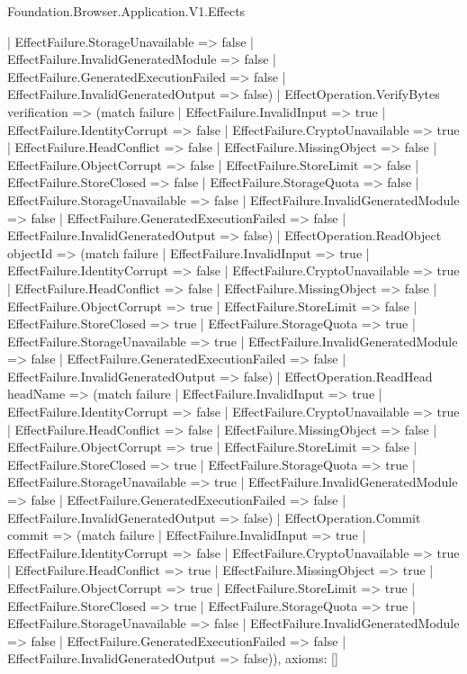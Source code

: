 \begin{lexlean}{Foundation.Browser.Application.V1.Effects}
\begin{semanticmodule}
{      | EffectFailure.StorageUnavailable => false
      | EffectFailure.InvalidGeneratedModule => false
      | EffectFailure.GeneratedExecutionFailed => false
      | EffectFailure.InvalidGeneratedOutput => false)
    | EffectOperation.VerifyBytes verification => (match failure
      | EffectFailure.InvalidInput => true
      | EffectFailure.IdentityCorrupt => false
      | EffectFailure.CryptoUnavailable => true
      | EffectFailure.HeadConflict => false
      | EffectFailure.MissingObject => false
      | EffectFailure.ObjectCorrupt => false
      | EffectFailure.StoreLimit => false
      | EffectFailure.StoreClosed => false
      | EffectFailure.StorageQuota => false
      | EffectFailure.StorageUnavailable => false
      | EffectFailure.InvalidGeneratedModule => false
      | EffectFailure.GeneratedExecutionFailed => false
      | EffectFailure.InvalidGeneratedOutput => false)
    | EffectOperation.ReadObject objectId => (match failure
      | EffectFailure.InvalidInput => true
      | EffectFailure.IdentityCorrupt => false
      | EffectFailure.CryptoUnavailable => true
      | EffectFailure.HeadConflict => false
      | EffectFailure.MissingObject => false
      | EffectFailure.ObjectCorrupt => true
      | EffectFailure.StoreLimit => false
      | EffectFailure.StoreClosed => true
      | EffectFailure.StorageQuota => true
      | EffectFailure.StorageUnavailable => true
      | EffectFailure.InvalidGeneratedModule => false
      | EffectFailure.GeneratedExecutionFailed => false
      | EffectFailure.InvalidGeneratedOutput => false)
    | EffectOperation.ReadHead headName => (match failure
      | EffectFailure.InvalidInput => true
      | EffectFailure.IdentityCorrupt => false
      | EffectFailure.CryptoUnavailable => true
      | EffectFailure.HeadConflict => false
      | EffectFailure.MissingObject => false
      | EffectFailure.ObjectCorrupt => true
      | EffectFailure.StoreLimit => false
      | EffectFailure.StoreClosed => true
      | EffectFailure.StorageQuota => true
      | EffectFailure.StorageUnavailable => true
      | EffectFailure.InvalidGeneratedModule => false
      | EffectFailure.GeneratedExecutionFailed => false
      | EffectFailure.InvalidGeneratedOutput => false)
    | EffectOperation.Commit commit => (match failure
      | EffectFailure.InvalidInput => true
      | EffectFailure.IdentityCorrupt => false
      | EffectFailure.CryptoUnavailable => true
      | EffectFailure.HeadConflict => true
      | EffectFailure.MissingObject => true
      | EffectFailure.ObjectCorrupt => true
      | EffectFailure.StoreLimit => true
      | EffectFailure.StoreClosed => true
      | EffectFailure.StorageQuota => true
      | EffectFailure.StorageUnavailable => false
      | EffectFailure.InvalidGeneratedModule => false
      | EffectFailure.GeneratedExecutionFailed => false
      | EffectFailure.InvalidGeneratedOutput => false)),
  axioms: []
}


\end{semanticmodule}
\end{lexlean}
